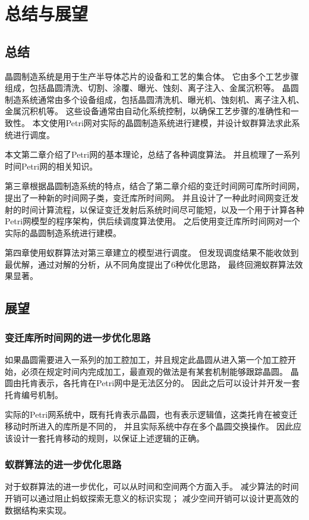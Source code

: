 \chapter{总结与展望}
\section{总结}
晶圆制造系统是用于生产半导体芯片的设备和工艺的集合体。
它由多个工艺步骤组成，包括晶圆清洗、切割、涂覆、曝光、蚀刻、离子注入、金属沉积等。
晶圆制造系统通常由多个设备组成，包括晶圆清洗机、曝光机、蚀刻机、离子注入机、金属沉积机等。
这些设备通常由自动化系统控制，以确保工艺步骤的准确性和一致性。
本文使用Petri网对实际的晶圆制造系统进行建模，并设计蚁群算法求此系统进行调度。

本文第二章介绍了Petri网的基本理论，总结了各种调度算法。
并且梳理了一系列时间Petri网的相关知识。

第三章根据晶圆制造系统的特点，结合了第二章介绍的变迁时间网可库所时间网，提出了一种新的时间网子类，变迁库所时间网。
并且设计了一种此时间网变迁发射的时间计算流程，以保证变迁发射后系统时间尽可能短，以及一个用于计算各种Petri网模型的程序架构，供后续调度算法使用。
之后使用变迁库所时间网对一个实际的晶圆制造系统进行建模。

第四章使用蚁群算法对第三章建立的模型进行调度。
但发现调度结果不能收敛到最优解，通过对解的分析，从不同角度提出了6种优化思路，
最终回溯蚁群算法效果显著。
\section{展望}
\subsection{变迁库所时间网的进一步优化思路}
如果晶圆需要进入一系列的加工腔加工，并且规定此晶圆从进入第一个加工腔开始，必须在规定时间内完成加工，最直观的做法是有某套机制能够跟踪晶圆。
晶圆由托肯表示，各托肯在Petri网中是无法区分的。
因此之后可以设计并开发一套托肯编号机制。

实际的Petri网系统中，既有托肯表示晶圆，也有表示逻辑值，这类托肯在被变迁移动时所进入的库所是不同的，
并且实际系统中存在多个晶圆交换操作。
因此应该设计一套托肯移动的规则，以保证上述逻辑的正确。
\subsection{蚁群算法的进一步优化思路}
对于蚁群算法的进一步优化，可以从时间和空间两个方面入手。
减少算法的时间开销可以通过阻止蚂蚁探索无意义的标识实现；
减少空间开销可以设计更高效的数据结构来实现。
